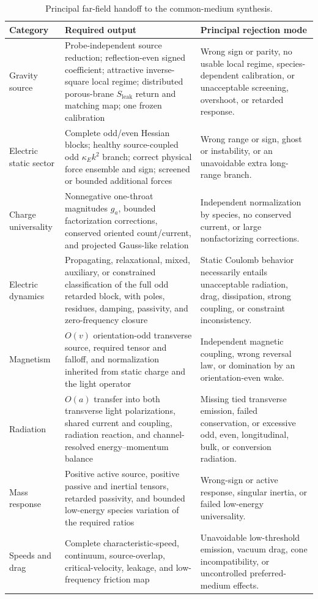 \begin{table}[htbp]
\centering
\caption{Principal far-field handoff to the common-medium synthesis.}
\label{tab:far-field-handoff}
\begin{tabularx}{\textwidth}{@{}L{0.20\textwidth}L{0.37\textwidth}Y@{}}
\toprule
\textbf{Category} & \textbf{Required output} & \textbf{Principal rejection mode} \\
\midrule
Gravity source
& Probe-independent source reduction; reflection-even signed coefficient;
  attractive inverse-square local regime; distributed porous-brane
  \(S_{\mathrm{leak}}\) return and matching map; one frozen calibration
& Wrong sign or parity, no usable local regime, species-dependent calibration,
  or unacceptable screening, overshoot, or retarded response. \\
Electric static sector
& Complete odd/even Hessian blocks; healthy source-coupled odd
  \(\kappa_Ek^2\) branch; correct physical force ensemble and sign; screened or
  bounded additional forces
& Wrong range or sign, ghost or instability, or an unavoidable extra long-range
  branch. \\
Charge universality
& Nonnegative one-throat magnitudes \(g_a\), bounded factorization corrections,
  conserved oriented count/current, and projected Gauss-like relation
& Independent normalization by species, no conserved current, or large
  nonfactorizing corrections. \\
Electric dynamics
& Propagating, relaxational, mixed, auxiliary, or constrained classification of
  the full odd retarded block, with poles, residues, damping, passivity, and
  zero-frequency closure
& Static Coulomb behavior necessarily entails unacceptable radiation, drag,
  dissipation, strong coupling, or constraint inconsistency. \\
Magnetism
& \(O(v)\) orientation-odd transverse source, required tensor and falloff, and
  normalization inherited from static charge and the light operator
& Independent magnetic coupling, wrong reversal law, or domination by an
  orientation-even wake. \\
Radiation
& \(O(a)\) transfer into both transverse light polarizations, shared current and
  coupling, radiation reaction, and channel-resolved energy--momentum balance
& Missing tied transverse emission, failed conservation, or excessive odd,
  even, longitudinal, bulk, or conversion radiation. \\
Mass response
& Positive active source, positive passive and inertial tensors, retarded
  passivity, and bounded low-energy species variation of the required ratios
& Wrong-sign or active response, singular inertia, or failed low-energy
  universality. \\
Speeds and drag
& Complete characteristic-speed, continuum, source-overlap, critical-velocity,
  leakage, and low-frequency friction map
& Unavoidable low-threshold emission, vacuum drag, cone incompatibility, or
  uncontrolled preferred-medium effects. \\
\bottomrule
\end{tabularx}
\end{table}

